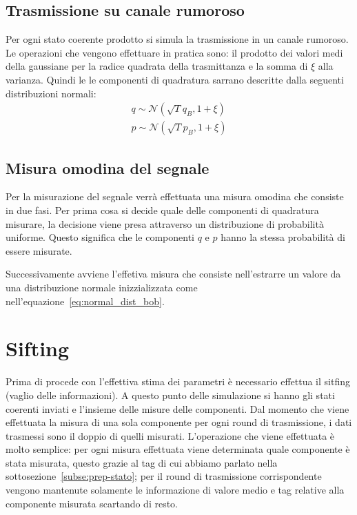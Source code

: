 \subsection{Trasmissione su canale rumoroso}
Per ogni stato coerente prodotto si simula la trasmissione in un canale rumoroso. Le operazioni che vengono effettuare in pratica sono: il prodotto dei valori medi della gaussiane per la radice quadrata della trasmittanza e la somma di $\xi$ alla varianza. Quindi le le componenti di quadratura sarrano descritte dalla seguenti distribuzioni normali:
\begin{equation}\label{eq:normal_dist_bob}
\begin{split}
q\sim \mathcal N(\sqrt{T} q_B, 1 + \xi) \\
p \sim \mathcal N(\sqrt{T} p_B, 1 + \xi)
\end{split}
\end{equation}
\subsection{Misura omodina del segnale}
Per la misurazione del segnale verr\`a effettuata una misura omodina che consiste in due fasi. Per prima cosa si decide quale delle componenti di quadratura misurare, la decisione viene presa attraverso un distribuzione di probabilit\`a uniforme. Questo significa che le componenti $q$ e $p$ hanno la stessa probabilit\`a di essere misurate.

Successivamente avviene l'effetiva misura che consiste nell'estrarre un valore da una distribuzione normale inizzializzata come nell'equazione~\ref{eq:normal_dist_bob}.

\section{Sifting}\label{se:sifting}
Prima di procede con l'effettiva stima dei parametri \`e necessario effettua il sitfing (vaglio delle informazioni). A questo punto delle simulazione si hanno gli stati coerenti inviati e l'insieme delle misure delle componenti. Dal momento che viene effettuata la misura di una sola componente per ogni round di trasmissione, i dati trasmessi sono il doppio di quelli misurati. L'operazione che viene effettuata \`e molto semplice: per ogni misura effettuata viene determinata quale componente \`e stata misurata, questo grazie al tag di cui abbiamo parlato nella sottosezione~\ref{subse:prep-stato}; per il round di trasmissione corrispondente vengono mantenute solamente le informazione di valore medio e tag relative alla componente misurata scartando di resto.

